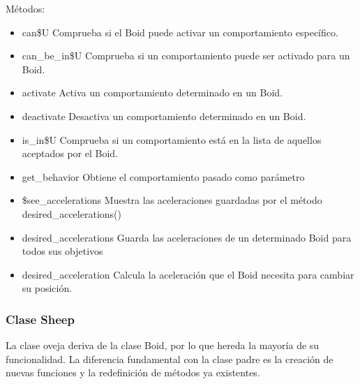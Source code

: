 Métodos:
\begin{itemize}
\item can\$U
Comprueba si el Boid puede activar un comportamiento específico.

\item can\_be\_in\$U
Comprueba si un comportamiento puede ser activado para un Boid.

\item activate
Activa un comportamiento determinado en un Boid.

\item deactivate
Desactiva un comportamiento determinado en un Boid.

\item is\_in\$U
Comprueba si un comportamiento está en la lista de aquellos aceptados por el Boid.

\item get\_behavior
Obtiene el comportamiento pasado como parámetro

\item \$see\_accelerations
Muestra las aceleraciones guardadas por el método desired\_accelerations()

\item desired\_accelerations
Guarda las aceleraciones de un determinado Boid para todos sus objetivos

\item desired\_acceleration
Calcula la aceleración que el Boid necesita para cambiar su posición.
\end{itemize}

\subsubsection{Clase Sheep}
\label{subsubsection:sheep}

La clase oveja deriva de la clase Boid, por lo que hereda la mayoría de su funcionalidad. La diferencia fundamental con la clase padre es 
la creación de nuevas funciones y la redefinición de métodos ya existentes.\\

